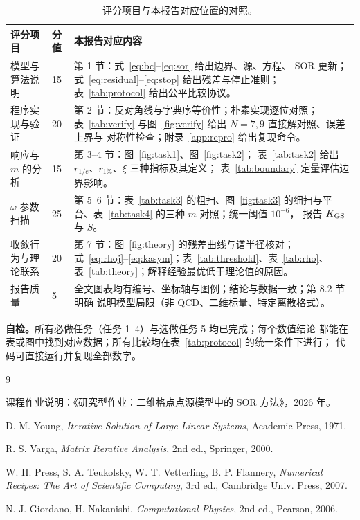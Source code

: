 \documentclass[UTF8,fontset=windows,a4paper,11pt]{ctexart}
\begin{document}
\begin{table}[htbp]
\centering
\caption{评分项目与本报告对应位置的对照。}
\label{tab:rubric}
\small
\begin{tabular}{p{3.5cm}p{1.1cm}p{9.7cm}}
\toprule
评分项目 & 分值 & 本报告对应内容 \\
\midrule
模型与算法说明 & 15 & 第 1 节：式~\eqref{eq:bc}--\eqref{eq:sor} 给出边界、源、方程、
SOR 更新；式~\eqref{eq:residual}--\eqref{eq:stop} 给出残差与停止准则；
表~\ref{tab:protocol} 给出公平比较协议。 \\
程序实现与验证 & 20 & 第 2 节：反对角线与字典序等价性；朴素实现逐位对照；
表~\ref{tab:verify} 与图~\ref{fig:verify} 给出 $N=7,9$ 直接解对照、误差上界与
对称性检查；附录~\ref{app:repro} 给出复现命令。 \\
响应与 $m$ 的分析 & 15 & 第 3--4 节：图~\ref{fig:task1}、图~\ref{fig:task2}；
表~\ref{tab:task2} 给出 $r_{1/e}$、$r_{1\%}$、$\xi$ 三种指标及其定义；
表~\ref{tab:boundary} 定量评估边界影响。 \\
$\omega$ 参数扫描 & 25 & 第 5--6 节：表~\ref{tab:task3} 的粗扫、图~\ref{fig:task3}
的细扫与平台、表~\ref{tab:task4} 的三种 $m$ 对照；统一阈值 $10^{-6}$，
报告 $K_{\rm GS}$ 与 $S$。 \\
收敛行为与理论联系 & 20 & 第 7 节：图~\ref{fig:theory} 的残差曲线与谱半径核对；
式~\eqref{eq:rhoj}--\eqref{eq:kasym}；表~\ref{tab:threshold}、表~\ref{tab:rho}、
表~\ref{tab:theory}；解释经验最优低于理论值的原因。 \\
报告质量 & 5 & 全文图表均有编号、坐标轴与图例；结论与数据一致；第 8.2 节明确
说明模型局限（非 QCD、二维标量、特定离散格式）。 \\
\bottomrule
\end{tabular}
\end{table}

\noindent\textbf{自检。}所有必做任务（任务 1--4）与选做任务 5 均已完成；每个数值结论
都能在表或图中找到对应数据；所有比较均在表~\ref{tab:protocol} 的统一条件下进行；
代码可直接运行并复现全部数字。

\begin{thebibliography}{9}
\small
\setlength{\itemsep}{1pt}

课程作业说明：《研究型作业：二维格点点源模型中的 SOR 方法》，2026 年。

D. M. Young,
\emph{Iterative Solution of Large Linear Systems},
Academic Press, 1971.

R. S. Varga,
\emph{Matrix Iterative Analysis}, 2nd ed.,
Springer, 2000.

W. H. Press, S. A. Teukolsky, W. T. Vetterling, B. P. Flannery,
\emph{Numerical Recipes: The Art of Scientific Computing}, 3rd ed.,
Cambridge Univ. Press, 2007.

N. J. Giordano, H. Nakanishi,
\emph{Computational Physics}, 2nd ed.,
Pearson, 2006.

\end{thebibliography}
\end{document}
